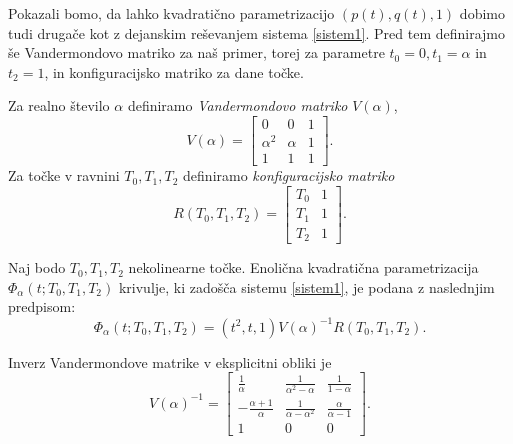 \documentclass[mat1]{fmfdelo}
\newcommand{\al}{\alpha}
\begin{document}
Pokazali bomo, da lahko kvadratično parametrizacijo $(p(t), q(t),1)$ dobimo tudi drugače kot z dejanskim reševanjem sistema \eqref{sistem1}. Pred tem definirajmo še Vandermondovo matriko za naš primer, torej za parametre $t_0 = 0, t_1 = \al$ in $t_2 = 1$, in konfiguracijsko matriko za dane točke.

\begin{definicija}
Za realno število $\al$ definiramo \emph{Vandermondovo matriko} $V(\al)$,
$$V(\al) = 
\begin{bmatrix}
0 & 0 & 1 \\
\al ^2 & \al & 1 \\
1 & 1 & 1
\end{bmatrix}
.$$
Za točke v ravnini $T_0, T_1, T_2$ definiramo \emph{konfiguracijsko matriko}
$$R(T_0, T_1, T_2) = 
\begin{bmatrix}
T_0 & 1 \\
T_1 & 1 \\
T_2 & 1
\end{bmatrix}
.$$
\end{definicija}


\begin{trditev}\label{parametrizacija}
Naj bodo $T_0, T_1, T_2$  nekolinearne točke. Enolična kvadratična parametrizacija $\Phi_\al(t; T_0, T_1, T_2)$ krivulje, ki zadošča sistemu \eqref{sistem1}, je podana z naslednjim predpisom:
$$ \Phi_\al(t; T_0, T_1, T_2) = (t^2, t, 1) V(\al)^{-1} R(T_0, T_1, T_2).$$
\end{trditev}


\begin{opomba}
Inverz Vandermondove matrike v eksplicitni obliki je
$$
V(\al)^{-1} = 
\begin{bmatrix}
\frac{1}{\al} & \frac{1}{\al^2 - \al} & \frac{1}{1-\al} \\
- \frac{\al + 1}{\al} & \frac{1}{\al - \al^2} & \frac{\al}{\al-1} \\
1 & 0 & 0
\end{bmatrix}
.$$
\end{opomba}
\end{document}

